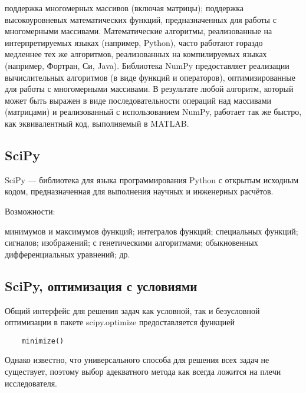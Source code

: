 \documentclass[12pt]{article} %
\begin{document}
поддержка многомерных массивов (включая матрицы);
поддержка высокоуровневых математических функций, предназначенных для работы с многомерными массивами.
Математические алгоритмы, реализованные на интерпретируемых языках (например, Python), часто работают гораздо медленнее тех же алгоритмов, реализованных на компилируемых языках (например, Фортран, Си, Java). Библиотека NumPy предоставляет реализации вычислительных алгоритмов (в виде функций и операторов), оптимизированные для работы с многомерными массивами. В результате любой алгоритм, который может быть выражен в виде последовательности операций над массивами (матрицами) и реализованный с использованием NumPy, работает так же быстро, как эквивалентный код, выполняемый в MATLAB.

\subsection{SciPy}
SciPy — библиотека для языка программирования Python с открытым исходным кодом, предназначенная для выполнения научных и инженерных расчётов.

Возможности:
\begin{itemize}
	 минимумов и максимумов функций;
	 интегралов функций;
	 специальных функций;
	 сигналов;
	 изображений;
	 с генетическими алгоритмами;
	 обыкновенных дифференциальных уравнений;
	 др.
\end{itemize}

\subsection{SciPy, оптимизация с условиями}
Общий интерфейс для решения задач как условной, так и безусловной оптимизации в пакете scipy.optimize предоставляется функцией\cite{2}
\begin{lstlisting}
	minimize()
\end{lstlisting}

Однако известно, что универсального способа для решения всех задач не существует, поэтому выбор адекватного метода как всегда ложится на плечи исследователя.\cite{2}
\end{document}
